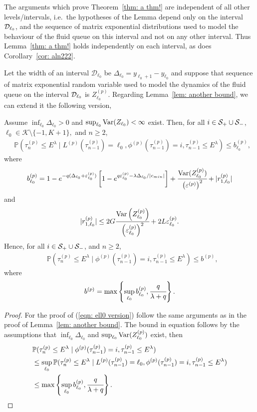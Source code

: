 The arguments which prove Theorem~\ref{thm: a thm!} are independent of all other levels/intervals, i.e.~the hypotheses of the Lemma depend only on the interval \(\mathcal{D}_{\ell_0}\), and the sequence of matrix exponential distributions used to model the behaviour of the fluid queue on this interval and not on any other interval. Thus Lemma~\ref{thm: a thm!} holds independently on each interval, as does Corollary~\ref{cor: aln222}.

Let the width of an interval \(\mathcal D_{\ell_0}\) be \(\Delta_{\ell_0}=y_{\ell_0+1}-y_{\ell_0}\) and suppose that sequence of matrix exponential random variable used to model the dynamics of the fluid queue on the interval \(\mathcal{D}_{\ell_0}\) is \(Z_{\ell_0}^{(p)}\). Regarding Lemma~\ref{lem: another bound}, we can extend it the following version, 
\begin{lem}\label{lem: another bound sdfg}
	Assume \(\inf_{\ell_0}\Delta_{\ell_0}>0\) and \(\sup_{\ell_0}\mathrm{Var}(Z_{\ell_0})<\infty\) exist. Then, for all \(i\in\mathcal S_+\cup \mathcal{S}_-\), \(\ell_0\in\mathcal K\setminus\{-1,K+1\},\) and \(n\geq 2\), 
	\begin{align}
		&\mathbb P(\tau_n^{(p)}\leq E^\lambda \mid L^{(p)}(\tau_{n-1}^{(p)}) = \ell_0, \phi^{(p)}(\tau_{n-1}^{(p)})=i, \tau_{n-1}^{(p)}\leq  E^\lambda ) \leq b_{\ell_0}^{(p)},\label{eqn: ell0 version}
	\end{align}
	where 
	\[b_{\ell_0}^{(p)} = 1-e^{-q(\Delta_{\ell_0}+\varepsilon_{\ell_0}^{(p)})}\left[1-e^{q\varepsilon_{\ell_0}^{(p)}-\lambda \Delta_{\ell_0}/|c_{min}|}\right] + \cfrac{\mathrm{Var}(Z_{\ell_0}^{(p)})}{\left(\varepsilon^{(p)}\right)^2} + |r_{1,\ell_0}^{(p)}| \]
	and  
	\[|r_{1,\ell_0}^{(p)}|\leq 2G\cfrac{\mathrm{Var} \left(Z_{\ell_0}^{(p)}\right)}{\left(\varepsilon_{\ell_0}^{(p)}\right)^2} + 2L\varepsilon_{\ell_0}^{(p)}.\]
	Hence, for all \(i\in\mathcal S_+\cup \mathcal{S}_-\), and \(n\geq 2\), 
	\begin{align}
		&\mathbb P(\tau_n^{(p)}\leq E^\lambda \mid \phi^{(p)}(\tau_{n-1}^{(p)})=i, \tau_{n-1}^{(p)}\leq  E^\lambda ) \leq b^{(p)}, \label{eqn: skjhg}
	\end{align}
	where 
	\[b^{(p)} = \max\left\{\sup_{\ell_0}b_{\ell_0}^{(p)}, \cfrac{q}{\lambda + q}\right\}.\]
\end{lem}
\begin{proof}
	For the proof of (\ref{eqn: ell0 version}) follow the same arguments as in the proof of Lemma~\ref{lem: another bound}. The bound in equation follows by the assumptions that \(\inf_{\ell_0}\Delta_{\ell_0}\) and \(\sup_{\ell_0}\mathrm{Var}(Z_{\ell_0}^{(p)})\) exist, then 
	\begin{align*}
		&\mathbb P(\tau_n^{(p)}\leq E^\lambda \mid \phi^{(p)}(\tau_{n-1}^{(p)})=i, \tau_{n-1}^{(p)}\leq  E^\lambda ) 
		\\&\leq \sup_{\ell_0} \mathbb P(\tau_n^{(p)}\leq E^\lambda \mid L^{(p)}(\tau_{n-1}^{(p)}) = \ell_0, \phi^{(p)}(\tau_{n-1}^{(p)})=i, \tau_{n-1}^{(p)}\leq  E^\lambda ) 
		\\&\leq \max\left\{\sup_{\ell_0}b_{\ell_0}^{(p)}, \cfrac{q}{\lambda + q}\right\}.\label{eqn: ell0 versionlskhg}
	\end{align*}
\end{proof}
